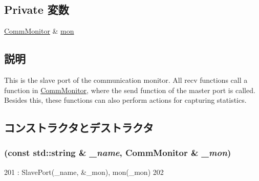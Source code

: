 \subsection*{Private 変数}
\begin{DoxyCompactItemize}
\item 
\hyperlink{classCommMonitor_1_1CommMonitor}{CommMonitor} \& \hyperlink{classCommMonitor_1_1MonitorSlavePort_ab6833d8d55cb403502472c073464905b}{mon}
\end{DoxyCompactItemize}


\subsection{説明}
This is the slave port of the communication monitor. All recv functions call a function in \hyperlink{classCommMonitor_1_1CommMonitor}{CommMonitor}, where the send function of the master port is called. Besides this, these functions can also perform actions for capturing statistics. 

\subsection{コンストラクタとデストラクタ}
\hypertarget{classCommMonitor_1_1MonitorSlavePort_ae614e8a09ac75ea9a97dcab60aa60099}{
\subsubsection[{MonitorSlavePort}]{ (const std::string \& {\em \_\-name}, \/  {\bf CommMonitor} \& {\em \_\-mon})}}
\label{classCommMonitor_1_1MonitorSlavePort_ae614e8a09ac75ea9a97dcab60aa60099}



\begin{DoxyCode}
201             : SlavePort(_name, &_mon), mon(_mon)
202         { }
\end{DoxyCode}


